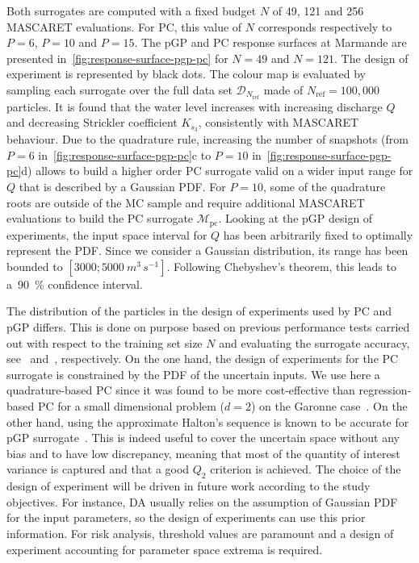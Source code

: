 Both surrogates are computed with a fixed budget $N$ of 49, 121 and 256 MASCARET evaluations. For PC, this value of $N$ corresponds respectively to $P = 6$, $P = 10$ and $P = 15$. The pGP and PC response surfaces at Marmande are presented in~\cref{fig:response-surface-pgp-pc} for $N = 49$ and $N = 121$. The design of experiment is represented by black dots. The colour map is evaluated by sampling each surrogate over the full data set $\mathcal{D}_{N_{\text{ref}}}$ made of $N_{\text{ref}} = 100,000$ particles. It is found that the water level increases with increasing discharge $Q$ and decreasing Strickler coefficient $K_{s_3}$, consistently with MASCARET behaviour. Due to the quadrature rule, increasing the number of snapshots (from $P = 6$ in~\cref{fig:response-surface-pgp-pc}c to $P = 10$ in~\cref{fig:response-surface-pgp-pc}d) allows to build a higher order PC surrogate valid on a wider input range for $Q$ that is described by a Gaussian PDF. For $P = 10$, some of the quadrature roots are outside of the MC sample and require additional MASCARET evaluations to build the PC surrogate $\mathcal{M}_{\text{pc}}$. Looking at the pGP design of experiments, the input space interval for $Q$ has been arbitrarily fixed to optimally represent the PDF. Since we consider a Gaussian distribution, its range has been bounded to $[3000;5000~\unit{m^3\,s^{-1}}]$. Following Chebyshev's theorem, this leads to a~90~\% confidence interval.

The distribution of the particles in the design of experiments used by PC and pGP differs. This is done on purpose based on previous performance tests carried out with respect to the training set size $N$ and evaluating the surrogate accuracy, see~\cite{elmocaydEMA} and~\cite{roy2016}, respectively. On the one hand, the design of experiments for the PC surrogate is constrained by the PDF of the uncertain inputs. We use here a quadrature-based PC since it was found to be more cost-effective than regression-based PC for a small dimensional problem ($d = 2$) on the Garonne case~\citep{elmocaydEMA}. On the other hand, using the approximate Halton's sequence is known to be accurate for pGP surrogate~\citep{Damblin2013}. This is indeed useful to cover the uncertain space without any bias and to have low discrepancy, meaning that most of the quantity of interest variance is captured and that a good $Q_2$ criterion is achieved. The choice of the design of experiment will be driven in future work according to the study objectives. For instance, DA usually relies on the assumption of Gaussian PDF for the input parameters, so the design of experiments can use this prior information. For risk analysis, threshold values are paramount and a design of experiment accounting for parameter space extrema is required.

